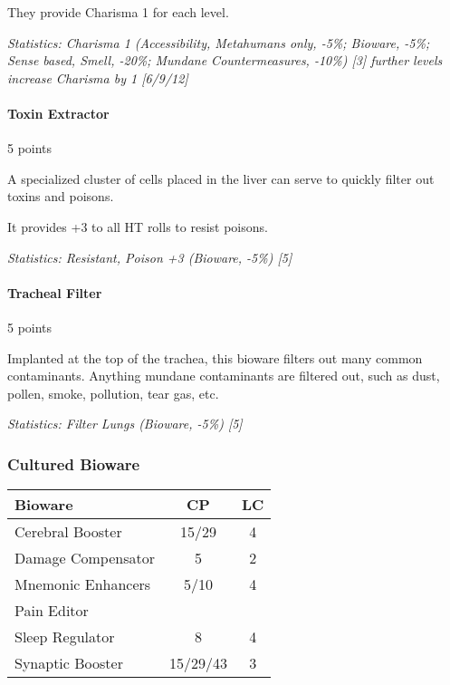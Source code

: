\begin{multicols*}{3}
	They provide Charisma 1 for each level.
	
	\textit{\textcolor{OliveGreen}{Statistics: Charisma 1 (Accessibility, Metahumans only, -5\%; Bioware, -5\%; Sense based, Smell, -20\%; Mundane Countermeasures, -10\%) [3] further levels increase Charisma by 1 [6/9/12]}}
	
	\paragraph{Toxin Extractor}
	\begin{flushright}
		5 points
	\end{flushright}
	
	A specialized cluster of cells placed in the liver can serve to quickly filter out toxins and poisons.
	
	It provides +3 to all HT rolls to resist poisons.
	
	\textit{\textcolor{OliveGreen}{Statistics: Resistant, Poison +3 (Bioware, -5\%) [5]}}
	
	\paragraph{Tracheal Filter}
	\begin{flushright}
		5 points
	\end{flushright}
	
	Implanted at the top of the trachea, this bioware filters out many common contaminants. Anything mundane contaminants are filtered out, such as dust, pollen, smoke, pollution, tear gas, etc.
	
	\textit{\textcolor{OliveGreen}{Statistics: Filter Lungs (Bioware, -5\%) [5]}}
	
	\subsubsection{Cultured Bioware}
	
	\begin{center}
		\begin{adjustwidth}{-4mm}{}
		\begin{tabularx}{0.35\textwidth}{|X|c|c|}
			\hline
			Bioware & CP & LC\\
			\hline
			\hline
			Cerebral Booster & 15/29 & 4 \\
			Damage Compensator & 5 & 2 \\
			Mnemonic Enhancers & 5/10 & 4 \\
			Pain Editor & & \\
			Sleep Regulator & 8 & 4 \\
			Synaptic Booster & 15/29/43 & 3 \\
			\hline
		\end{tabularx}
		\end{adjustwidth}
	\end{center}
	

\end{multicols*}
